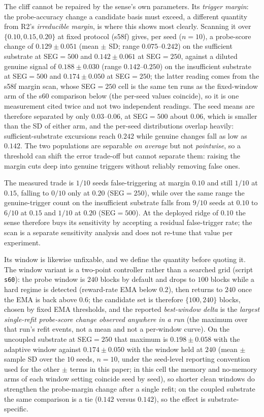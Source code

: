 \documentclass[preprint,12pt]{elsarticle}
\begin{document}
The cliff cannot be repaired by the sense's own parameters. Its
\emph{trigger margin}: the probe-accuracy change a candidate basis must
exceed, a different quantity from R2's \emph{irreducible margin}, is where
this shows most clearly. Scanning it over $\{0.10,0.15,0.20\}$ at fixed
protocol (s58f) gives, per seed ($n=10$), a probe-score change of
$0.129\pm0.051$ (mean $\pm$ SD; range $0.075$--$0.242$) on the sufficient
substrate at SEG$=500$ and $0.142\pm0.061$ at SEG$=250$, against a diluted
genuine signal of $0.188\pm0.030$ (range $0.142$--$0.250$) on the
insufficient substrate at SEG$=500$ and $0.174\pm0.050$ at SEG$=250$; the
latter reading comes from the s58f margin scan, whose SEG$=250$ cell is the
same ten runs as the fixed-window arm of the s60 comparison below (the
per-seed values coincide), so it is one measurement cited twice and not two
independent readings. The
seed means are therefore separated by only $0.03$--$0.06$, at SEG$=500$
about $0.06$, which is smaller than the SD of either arm, and the
per-seed distributions overlap heavily: sufficient-substrate excursions reach
$0.242$ while genuine changes fall as low as $0.142$. The two populations
are separable \emph{on average} but not \emph{pointwise}, so a threshold can
shift the error trade-off but cannot separate them: raising
the margin cuts deep into genuine
triggers without reliably removing false ones.

The measured trade is
$1/10$ seeds false-triggering at margin $0.10$ and still $1/10$ at $0.15$,
falling to $0/10$ only at $0.20$ (SEG$=250$), while over the same range the
genuine-trigger count on the insufficient substrate falls from $9/10$ seeds
at $0.10$ to $6/10$ at $0.15$ and $1/10$ at $0.20$ (SEG$=500$). At the
deployed ridge of $0.10$ the sense therefore buys its sensitivity by
accepting a residual false-trigger rate; the scan is a separate sensitivity
analysis and does not re-tune that value per experiment.

Its window is likewise
unfixable, and we define the quantity before quoting it. The window variant is
a two-point controller rather than a searched grid (script \texttt{s60}): the
probe window is $240$ blocks by default and drops to $100$ blocks while a hard
regime is detected (reward-rate EMA below $0.2$), then returns to $240$ once
the EMA is back above $0.6$; the candidate set is therefore
$\{100,240\}$ blocks, chosen by fixed EMA thresholds, and the reported
\emph{best-window delta} is the \emph{largest single-refit probe-score change
observed anywhere in a run} (the maximum over that run's refit events, not a
mean and not a per-window curve). On the uncoupled substrate at SEG$=250$ that
maximum is $0.198\pm0.058$ with the adaptive window against $0.174\pm0.050$
with the window held at $240$ (mean $\pm$ sample SD over the $10$ seeds,
$n=10$, under the seed-level reporting convention used for the other $\pm$
terms in this paper; in this cell the memory and no-memory arms of each window setting coincide seed by seed), so shorter clean
windows do strengthen the probe-margin change after a single refit; on the
coupled substrate the same comparison is a tie ($0.142$ versus $0.142$), so
the effect is substrate-specific.
\end{document}
